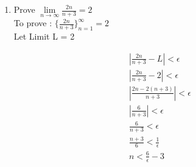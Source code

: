 \documentclass[11pt, letterpaper]{article}
\begin{document}
\begin{enumerate}
{\begin{enumerate}
{				\begin{eqnarray}
					\left| \frac{2n}{n+3} - 3 \right| < \frac{1}{5} \\
					\left| \frac{2n - 3(n + 3)}{n + 3} \right| < \frac{1}{5} \nonumber \\
					\left| \frac{-n-9}{n + 3} \right| < \frac{1}{5} \nonumber \\
					\left| \frac{n+9}{n+3} \right| < \frac{1}{5} \nonumber \\
					\frac{-1}{5} < \left| \frac{n+9}{n+3} \right| < \frac{1}{5} 
				\end{eqnarray}
				
				\begin{center}
					From (2)
				\end{center}
				
				\begin{eqnarray}									
					\frac{n+9}{n+3} < \frac{1}{5} \nonumber \\
					5(n + 9) < n + 3 \nonumber \\
					5n + 45 < n + 3 \nonumber \\
					4n + 42 < 0 \nonumber \\
					2n + 21 < 0 \nonumber \\
					n < -21/2
				\end{eqnarray} 
				
				Now according to (3), we have to find n $< -21/2$ which isn't possible.\\
				Hence for no N $\in$ I is equation (1) satisfied.														
			}
			\item{Prove $\lim \limits_{n \to \infty} \frac{2n}{n+3}  = 2$ \\
				To prove : $ \lbrace \frac{2n}{n+3} \rbrace_{n=1}^\infty = 2$\\
				Let Limit L = 2
				
				\setcounter{equation}{0}				
				\begin{eqnarray}
					\left| \frac{2n}{n+3} - L \right| < \epsilon \nonumber \\
					\left| \frac{2n}{n+3} - 2 \right| < \epsilon \\			
					\left| \frac{2n - 2(n+3)}{n+3} \right| < \epsilon \nonumber \\
					\left| \frac{6}{n+3} \right| < \epsilon \nonumber \\
					\frac{6}{n+3} < \epsilon \nonumber \\
					\frac{n+3}{6} < \frac{1}{\epsilon} \nonumber \\
					n < \frac{6}{\epsilon} - 3
				\end{eqnarray}									
				
}
\end{enumerate}}
\end{enumerate}
\end{document}
